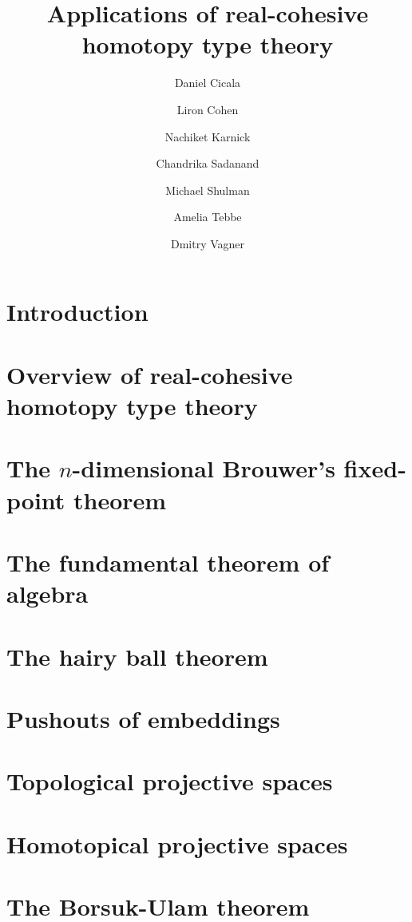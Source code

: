 \documentclass{article}
\title{Applications of real-cohesive homotopy type theory}
\author{Daniel Cicala \and Liron Cohen \and Nachiket Karnick \and Chandrika Sadanand \and Michael Shulman \and Amelia Tebbe \and Dmitry Vagner}
\begin{document}
\maketitle

\section{Introduction}
\label{sec:intro}


\section{Overview of real-cohesive homotopy type theory}
\label{sec:rcohott}


\section{The $n$-dimensional Brouwer's fixed-point theorem}
\label{sec:nd-brouwer}


\section{The fundamental theorem of algebra}
\label{sec:fta}


\section{The hairy ball theorem}
\label{sec:hairy-ball}


\section{Pushouts of embeddings}
\label{sec:push-emb}


\section{Topological projective spaces}
\label{sec:topproj}


\section{Homotopical projective spaces}
\label{sec:homot-proj-spac}


\section{The Borsuk-Ulam theorem}
\label{sec:borsuk-ulam}



\nocite{shulman:bfp,brunerie:thesis,br:rp-hott}

\end{document}
